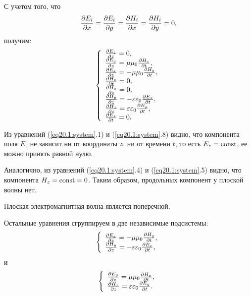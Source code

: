 	С учетом того, что
    \[
        \frac{\partial E_i}{\partial x} = \frac{\partial E_i}{\partial y} = \frac{\partial H_i}{\partial x} =
        \frac{\partial H_i}{\partial y} = 0,
    \]
    получим:
	\begin{equation}
        \left\{
        \begin{array}{l}		
            \frac{\partial E_z}{\partial z} = 0, \\
            \frac{\partial E_y}{\partial z} = \mu\mu_0\frac{\partial H_x}{\partial t}, \\
            \frac{\partial E_x}{\partial z} = -\mu\mu_0\frac{\partial H_y}{\partial t}, \\
            \frac{\partial H_z}{\partial t} = 0, \\
            \frac{\partial H_z}{\partial z} = 0, \\
            \frac{\partial H_y}{\partial z} = -\varepsilon\varepsilon_0\frac{\partial E_x}{\partial t}, \\
            \frac{\partial H_x}{\partial z}= \varepsilon\varepsilon_0\frac{\partial E_y}{\partial t}, \\
            \frac{\partial E_z}{\partial t} = 0.
	    \end{array}
        \right.
        \label{eq20.1:system}
    \end{equation}
	
	Из уравнений (\ref{eq20.1:system}.1) и (\ref{eq20.1:system}.8) видно, что
    компонента поля \( E_z \) не зависит ни от координаты \( z \), ни от времени
    \( t \), то есть \( E_z = \mathrm{const} \), ее можно принять равной нулю.

	Аналогично, из уравнений (\ref{eq20.1:system}.4) и (\ref{eq20.1:system}.5)
    видно, что компонента \( H_z = \mathrm{const} = 0 \). Таким образом, продольных
    компонент у плоской волны нет.
	
	\begin{conclusion}
        Плоская электромагнитная волна является поперечной.
	\end{conclusion}

	Остальные уравнения сгруппируем в две независимые подсистемы:
	\begin{equation}
        \left\{
        \begin{array}{l}
            \frac{\partial E_x}{\partial z} = -\mu\mu_0\frac{\partial H_y}{\partial t}, \\
            \frac{\partial H_y}{\partial z} = -\varepsilon\varepsilon_0\frac{\partial E_x}{\partial t},
	    \end{array}
        \right.
        \label{eq20.1:5}
    \end{equation}
	и
	\begin{equation}
        \left\{
        \begin{array}{l}
            \frac{\partial E_y}{\partial z} = \mu\mu_0\frac{\partial H_x}{\partial t}, \\
            \frac{\partial H_x}{\partial z} = \varepsilon\varepsilon_0\frac{\partial E_y}{\partial t}.
	    \end{array}
        \right.
        \label{eq20.1:6}
    \end{equation}

